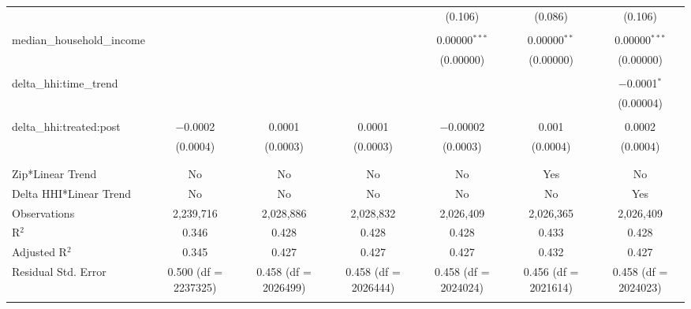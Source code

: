 \begin{table}[H]
{\begin{tabular}{@{\extracolsep{5pt}}lcccccc}
   &  &  &  & (0.106) & (0.086) & (0.106) \\  

   & & & & & & \\  

  median\_household\_income &  &  &  & 0.00000$^{***}$ & 0.00000$^{**}$ & 0.00000$^{***}$ \\  

   &  &  &  & (0.00000) & (0.00000) & (0.00000) \\  

   & & & & & & \\  

  delta\_hhi:time\_trend &  &  &  &  &  & $-$0.0001$^{*}$ \\  

   &  &  &  &  &  & (0.00004) \\  

   & & & & & & \\  

  delta\_hhi:treated:post & $-$0.0002 & 0.0001 & 0.0001 & $-$0.00002 & 0.001 & 0.0002 \\  

   & (0.0004) & (0.0003) & (0.0003) & (0.0003) & (0.0004) & (0.0004) \\  

   & & & & & & \\  

 \hline \\[-1.8ex]  

 Zip*Linear Trend & No & No & No & No & Yes & No \\  

 Delta HHI*Linear Trend & No & No & No & No & No & Yes \\  

 Observations & 2,239,716 & 2,028,886 & 2,028,832 & 2,026,409 & 2,026,365 & 2,026,409 \\  

 R$^{2}$ & 0.346 & 0.428 & 0.428 & 0.428 & 0.433 & 0.428 \\  

 Adjusted R$^{2}$ & 0.345 & 0.427 & 0.427 & 0.427 & 0.432 & 0.427 \\  

 Residual Std. Error & 0.500 (df = 2237325) & 0.458 (df = 2026499) & 0.458 (df = 2026444) & 0.458 (df = 2024024) & 0.456 (df = 2021614) & 0.458 (df = 2024023) \\  

 \hline  

 \hline \\[-1.8ex]  


\end{tabular}}
\end{table}
